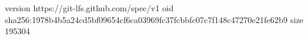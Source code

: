 version https://git-lfs.github.com/spec/v1
oid sha256:1978b4b5a24cd5bf09654cf6ca03969fc37fcbbfc07c7f148c47270e21fe62b9
size 195304
